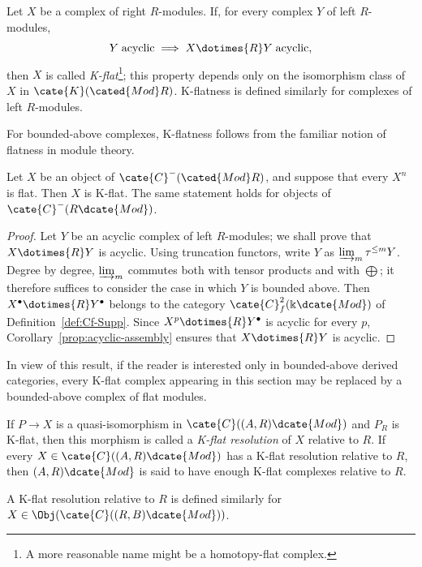 \begin{definition}
	Let $X$ be a complex of right $R$-modules. If, for every complex $Y$ of
	left $R$-modules,
	\[ Y \;\text{acyclic} \implies X \dotimes{R} Y\;\text{acyclic}, \]
	then $X$ is called \emph{K-flat}\footnote{A more reasonable name might be a
	homotopy-flat complex.}; this property depends only on the isomorphism class
	of $X$ in $\cate{K}(\cated{Mod}R)$. K-flatness is defined similarly for
	complexes of left $R$-modules.
\end{definition}

For bounded-above complexes, K-flatness follows from the familiar notion of
flatness in module theory.

\begin{proposition}\label{prop:flat-K-flat}
	Let $X$ be an object of $\cate{C}^-(\cated{Mod}R)$, and suppose that every
	$X^n$ is flat. Then $X$ is K-flat. The same statement holds for objects of
	$\cate{C}^-(R\dcate{Mod})$.
\end{proposition}

\begin{proof}
	Let $Y$ be an acyclic complex of left $R$-modules; we shall prove that
	$X\dotimes{R}Y$ is acyclic. Using truncation functors, write $Y$ as
	$\varinjlim_m\tau^{\leq m}Y$. Degree by degree, $\varinjlim_m$ commutes
	both with tensor products \cite[Proposition 6.9.2]{Li1} and with
	$\bigoplus$; it therefore suffices to consider the case in which $Y$ is
	bounded above. Then $X^\bullet\dotimes{R}Y^\bullet$ belongs to the category
	$\cate{C}^2_f(\Bbbk\dcate{Mod})$ of Definition~\ref{def:Cf-Supp}. Since
	$X^p\dotimes{R}Y^\bullet$ is acyclic for every $p$,
	Corollary~\ref{prop:acyclic-assembly} ensures that $X\dotimes{R}Y$ is
	acyclic.
\end{proof}

In view of this result, if the reader is interested only in bounded-above
derived categories, every K-flat complex appearing in this section may be
replaced by a bounded-above complex of flat modules.

\begin{definition}
	If $P\to X$ is a quasi-isomorphism in
	$\cate{C}((A,R)\dcate{Mod})$ and $P_R$ is K-flat, then this morphism is
	called a \emph{K-flat resolution} of $X$ relative to $R$. If every
	$X\in\cate{C}((A,R)\dcate{Mod})$ has a K-flat resolution relative to $R$,
	then $(A,R)\dcate{Mod}$ is said to have enough K-flat complexes relative to
	$R$.

	A K-flat resolution relative to $R$ is defined similarly for
	$X\in\Obj(\cate{C}((R,B)\dcate{Mod}))$.
\end{definition}

